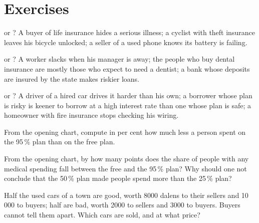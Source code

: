 \section{Exercises}

\begin{exercise}[$\star$]\label{exo:g11:asymmetric-information:1}
 or ? A buyer of life insurance hides a serious illness; a cyclist with theft insurance leaves his bicycle unlocked; a seller of a used phone
knows its battery is failing.
\end{exercise}

\begin{exercise}[$\star$]\label{exo:g11:asymmetric-information:2}
 or ? A worker slacks when his manager is away; the people who buy dental insurance are mostly those who expect to need a dentist; a bank whose
deposits are insured by the state makes riskier loans.
\end{exercise}

\begin{exercise}[$\star$]\label{exo:g11:asymmetric-information:3}
 or ? A driver of a hired car drives it harder than his own; a borrower whose plan is risky is keener to borrow at a high interest rate than one
whose plan is safe; a homeowner with fire insurance stops checking his wiring.
\end{exercise}

\begin{exercise}[$\star$]\label{exo:g11:asymmetric-information:4}
From the opening chart, compute in per cent how much less a person spent on the 95\,\% plan than on the free plan.
\end{exercise}

\begin{exercise}[$\star$]\label{exo:g11:asymmetric-information:5}
From the opening chart, by how many points does the share of people with any medical spending fall between the free and the 95\,\% plan? Why should one not conclude that
the 50\,\% plan made people spend more than the 25\,\% plan?
\end{exercise}

\begin{exercise}[$\star\star$]\label{exo:g11:asymmetric-information:6}
Half the used cars of a town are good, worth 8000 dalens to their sellers and 10\,000 to buyers; half are bad, worth 2000 to sellers and 3000 to buyers. Buyers cannot tell
them apart. Which cars are sold, and at what price?
\end{exercise}

